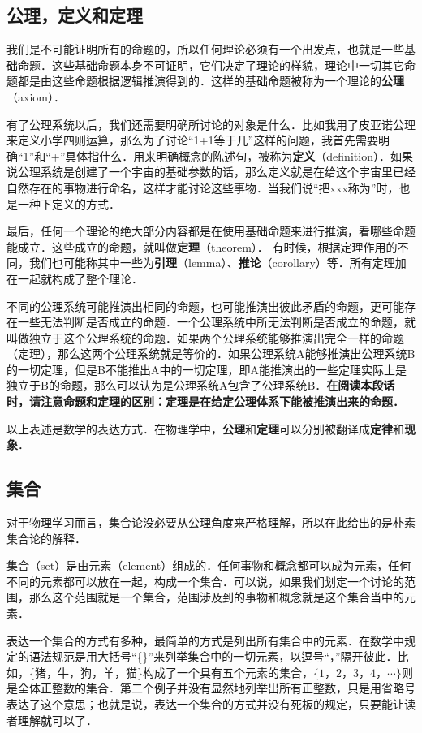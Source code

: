 \subsection{公理，定义和定理}
我们是不可能证明所有的命题的，所以任何理论必须有一个出发点，也就是一些基础命题．这些基础命题本身不可证明，它们决定了理论的样貌，理论中一切其它命题都是由这些命题根据逻辑推演得到的．这样的基础命题被称为一个理论的\textbf{公理}（axiom）．

有了公理系统以后，我们还需要明确所讨论的对象是什么．比如我用了皮亚诺公理来定义小学四则运算，那么为了讨论“1+1等于几”这样的问题，我首先需要明确“1”和“+”具体指什么．用来明确概念的陈述句，被称为\textbf{定义}（definition）．如果说公理系统是创建了一个宇宙的基础参数的话，那么定义就是在给这个宇宙里已经自然存在的事物进行命名，这样才能讨论这些事物．当我们说“把xxx称为”时，也是一种下定义的方式．

最后，任何一个理论的绝大部分内容都是在使用基础命题来进行推演，看哪些命题能成立．这些成立的命题，就叫做\textbf{定理}（theorem）． 有时候，根据定理作用的不同，我们也可能称其中一些为\textbf{引理}（lemma）、\textbf{推论}（corollary）等．所有定理加在一起就构成了整个理论．

不同的公理系统可能推演出相同的命题，也可能推演出彼此矛盾的命题，更可能存在一些无法判断是否成立的命题．一个公理系统中所无法判断是否成立的命题，就叫做独立于这个公理系统的命题．如果两个公理系统能够推演出完全一样的命题（定理），那么这两个公理系统就是等价的．如果公理系统A能够推演出公理系统B的一切定理，但是B不能推出A中的一切定理，即A能推演出的一些定理实际上是独立于B的命题，那么可以认为是公理系统A包含了公理系统B．\textbf{在阅读本段话时，请注意命题和定理的区别：定理是在给定公理体系下能被推演出来的命题．}

以上表述是数学的表达方式．在物理学中，\textbf{公理}和\textbf{定理}可以分别被翻译成\textbf{定律}和\textbf{现象}． 

\subsection{集合}

对于物理学习而言，集合论没必要从公理角度来严格理解，所以在此给出的是朴素集合论的解释．

集合（set）是由元素（element）组成的．任何事物和概念都可以成为元素，任何不同的元素都可以放在一起，构成一个集合．可以说，如果我们划定一个讨论的范围，那么这个范围就是一个集合，范围涉及到的事物和概念就是这个集合当中的元素．

表达一个集合的方式有多种，最简单的方式是列出所有集合中的元素．在数学中规定的语法规范是用大括号“\{\}”来列举集合中的一切元素，以逗号“，”隔开彼此．比如，\{猪，牛，狗，羊，猫\}构成了一个具有五个元素的集合，$\{1，2，3，4，\cdots\}$则是全体正整数的集合．第二个例子并没有显然地列举出所有正整数，只是用省略号表达了这个意思；也就是说，表达一个集合的方式并没有死板的规定，只要能让读者理解就可以了．

